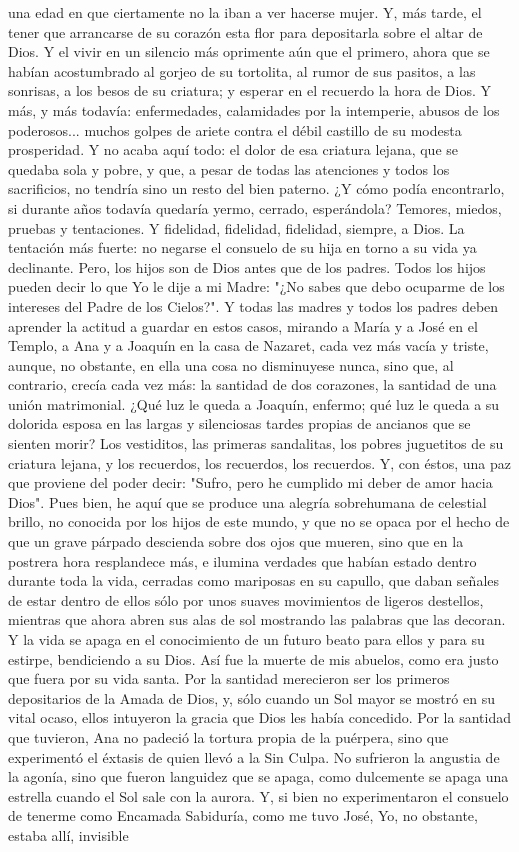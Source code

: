 \documentclass[12pt]{book} %
\begin{document}
una edad en que ciertamente no la iban a ver hacerse mujer. Y, más tarde, el tener que arrancarse de su corazón esta flor para depositarla sobre el altar de Dios. Y el vivir en un silencio más oprimente aún que el primero, ahora que se habían acostumbrado al gorjeo de su tortolita, al rumor de sus pasitos, a las sonrisas, a los besos de su criatura; y esperar en el recuerdo la hora de Dios. Y más, y más todavía: enfermedades, calamidades por la intemperie, abusos de los poderosos... muchos golpes de ariete contra el débil castillo de su modesta prosperidad. Y no acaba aquí todo: el dolor de esa criatura lejana, que se quedaba sola y pobre, y que, a pesar de todas las atenciones y todos los sacrificios, no tendría sino un resto del bien paterno. ¿Y cómo podía encontrarlo, si durante años todavía quedaría yermo, cerrado, esperándola? Temores, miedos, pruebas y tentaciones. Y fidelidad, fidelidad, fidelidad, siempre, a Dios. La tentación más fuerte: no negarse el consuelo de su hija en torno a su vida ya declinante. Pero, los hijos son de Dios antes que de los padres. Todos los hijos pueden decir lo que Yo le dije a mi Madre: "¿No sabes que debo ocuparme de los intereses del Padre de los Cielos?". Y todas las madres y todos los padres deben aprender la actitud a guardar en estos casos, mirando a María y a José en el Templo, a Ana y a Joaquín en la casa de Nazaret, cada vez más vacía y triste, aunque, no obstante, en ella una cosa no disminuyese nunca, sino que, al contrario, crecía cada vez más: la santidad de dos corazones, la santidad de una unión matrimonial. ¿Qué luz le queda a Joaquín, enfermo; qué luz le queda a su dolorida esposa en las largas y silenciosas tardes propias de ancianos que se sienten morir? Los vestiditos, las primeras sandalitas, los pobres juguetitos de su criatura lejana, y los recuerdos, los recuerdos, los recuerdos. Y, con éstos, una paz que proviene del poder decir: "Sufro, pero he cumplido mi deber de amor hacia Dios". Pues bien, he aquí que se produce una alegría sobrehumana de celestial brillo, no conocida por los hijos de este mundo, y que no se opaca por el hecho de que un grave párpado descienda sobre dos ojos que mueren, sino que en la postrera hora resplandece más, e ilumina verdades que habían estado dentro durante toda la vida, cerradas como mariposas en su capullo, que daban señales de estar dentro de ellos sólo por unos suaves movimientos de ligeros destellos, mientras que ahora abren sus alas de sol mostrando las palabras que las decoran. Y la vida se apaga en el conocimiento de un futuro beato para ellos y para su estirpe, bendiciendo a su Dios. Así fue la muerte de mis abuelos, como era justo que fuera por su vida santa. Por la santidad merecieron ser los primeros depositarios de la Amada de Dios, y, sólo cuando un Sol mayor se mostró en su vital ocaso, ellos intuyeron la gracia que Dios les había concedido. Por la santidad que tuvieron, Ana no padeció la tortura propia de la puérpera, sino que experimentó el éxtasis de quien llevó a la Sin Culpa. No sufrieron la angustia de la agonía, sino que fueron languidez que se apaga, como dulcemente se apaga una estrella cuando el Sol sale con la aurora. Y, si bien no experimentaron el consuelo de tenerme como Encamada Sabiduría, como me tuvo José, Yo, no obstante, estaba allí, invisible 
\end{document}
